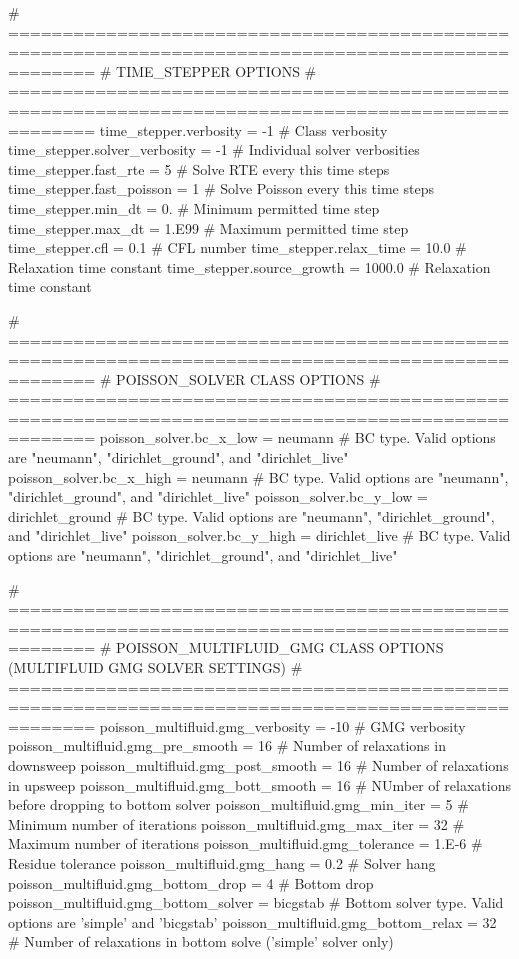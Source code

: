 \begin{DoxyVerb}
  # ====================================================================================================
  # TIME_STEPPER OPTIONS
  # ====================================================================================================
  time_stepper.verbosity        = -1    # Class verbosity
  time_stepper.solver_verbosity = -1    # Individual solver verbosities
  time_stepper.fast_rte         = 5     # Solve RTE every this time steps
  time_stepper.fast_poisson     = 1     # Solve Poisson every this time steps
  time_stepper.min_dt           = 0.    # Minimum permitted time step
  time_stepper.max_dt           = 1.E99 # Maximum permitted time step
  time_stepper.cfl              = 0.1   # CFL number
  time_stepper.relax_time       = 10.0  # Relaxation time constant
  time_stepper.source_growth    = 1000.0 # Relaxation time constant

  # ====================================================================================================
  # POISSON_SOLVER CLASS OPTIONS
  # ====================================================================================================
  poisson_solver.bc_x_low  = neumann               # BC type. Valid options are "neumann", "dirichlet_ground", and "dirichlet_live"
  poisson_solver.bc_x_high = neumann               # BC type. Valid options are "neumann", "dirichlet_ground", and "dirichlet_live"
  poisson_solver.bc_y_low  = dirichlet_ground      # BC type. Valid options are "neumann", "dirichlet_ground", and "dirichlet_live"
  poisson_solver.bc_y_high = dirichlet_live        # BC type. Valid options are "neumann", "dirichlet_ground", and "dirichlet_live"

  # ====================================================================================================
  # POISSON_MULTIFLUID_GMG CLASS OPTIONS (MULTIFLUID GMG SOLVER SETTINGS)
  # ====================================================================================================
  poisson_multifluid.gmg_verbosity     = -10       # GMG verbosity
  poisson_multifluid.gmg_pre_smooth    = 16         # Number of relaxations in downsweep
  poisson_multifluid.gmg_post_smooth   = 16         # Number of relaxations in upsweep
  poisson_multifluid.gmg_bott_smooth   = 16         # NUmber of relaxations before dropping to bottom solver
  poisson_multifluid.gmg_min_iter      = 5         # Minimum number of iterations
  poisson_multifluid.gmg_max_iter      = 32        # Maximum number of iterations
  poisson_multifluid.gmg_tolerance     = 1.E-6     # Residue tolerance
  poisson_multifluid.gmg_hang          = 0.2       # Solver hang
  poisson_multifluid.gmg_bottom_drop   = 4         # Bottom drop
  poisson_multifluid.gmg_bottom_solver = bicgstab  # Bottom solver type. Valid options are 'simple' and 'bicgstab'
  poisson_multifluid.gmg_bottom_relax  = 32        # Number of relaxations in bottom solve ('simple' solver only)


\end{DoxyVerb}

